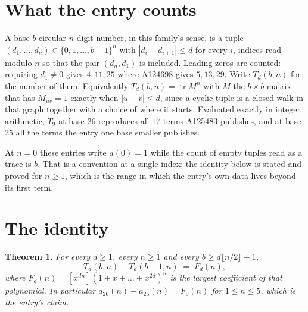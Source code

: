 \documentclass[11pt,a4paper]{article}
\theoremstyle{plain}
\newtheorem{theorem}{Theorem}
\theoremstyle{definition}
\begin{document}
\section{What the entry counts}

A base-$b$ circular $n$-digit number, in this family's sense, is a tuple
$(d_1,\dots,d_n)\in\{0,1,\dots,b-1\}^{n}$ with $|d_i-d_{i+1}|\le d$ for every $i$, indices
read modulo $n$ so that the pair $(d_n,d_1)$ is included. Leading zeros are counted: requiring
$d_1\ne0$ gives $4,11,25$ where A124698 gives $5,13,29$. Write $T_d(b,n)$ for the number of
them. Equivalently $T_d(b,n)=\operatorname{tr}M^{n}$ with $M$ the $b\times b$ matrix that has
$M_{uv}=1$ exactly when $|u-v|\le d$, since a cyclic tuple is a closed walk in that graph
together with a choice of where it starts. Evaluated exactly in integer arithmetic, $T_{9}$
at base $26$ reproduces all $17$ terms A125483 publishes, and at base $25$ all the
terms the entry one base smaller publishes.

At $n=0$ these entries write $a(0)=1$ while the count of empty tuples read as a trace is $b$.
That is a convention at a single index; the identity below is stated and proved for $n\ge1$,
which is the range in which the entry's own data lives beyond its first term.

\section{The identity}

\begin{theorem}
For every $d\ge1$, every $n\ge1$ and every $b\ge d\lfloor n/2\rfloor+1$,
\[
T_d(b,n)-T_d(b-1,n)\;=\;F_d(n),
\]
where $F_d(n)=[x^{dn}](1+x+\dots+x^{2d})^{n}$ is the largest coefficient of that
polynomial. In particular $a_{26}(n)-a_{25}(n)=F_{9}(n)$ for $1\le n\le5$, which
is the entry's claim.
\end{theorem}
\end{document}
